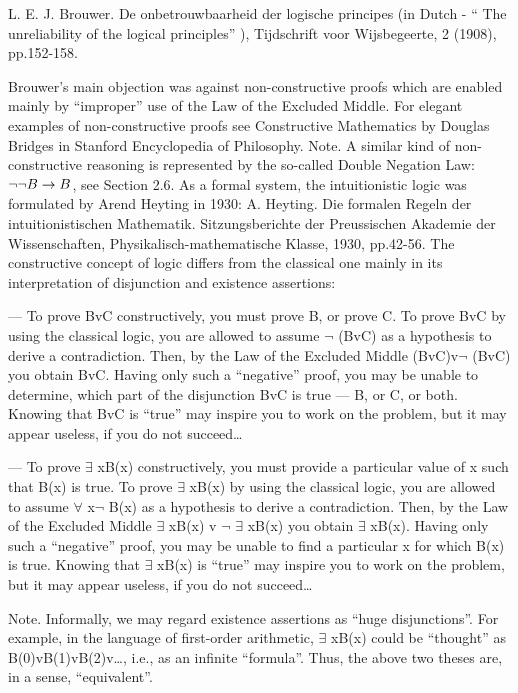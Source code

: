 L. E. J. Brouwer. De onbetrouwbaarheid der logische principes (in Dutch - `` The unreliability of the logical principles'' ), Tijdschrift voor Wijsbegeerte, 2 (1908), pp.152-158.

Brouwer's main objection was against non-constructive proofs which are enabled mainly by ``improper'' use of the Law of the Excluded Middle.  For elegant examples of non-constructive proofs see Constructive Mathematics by Douglas Bridges in Stanford Encyclopedia of Philosophy.  Note. A similar kind of non-constructive reasoning is represented by the so-called Double Negation Law: \(\neg \neg B\rightarrow B\), see Section 2.6.  As a formal system, the intuitionistic logic was formulated by Arend Heyting in 1930: A. Heyting. Die formalen Regeln der intuitionistischen Mathematik. Sitzungsberichte der Preussischen Akademie der Wissenschaften, Physikalisch-mathematische Klasse, 1930, pp.42-56.  The constructive concept of logic differs from the classical one mainly in its interpretation of disjunction and existence assertions:

--- To prove BvC constructively, you must prove B, or prove C. To prove BvC by using the classical logic, you are allowed to assume \(\neg\) (BvC) as a hypothesis to derive a contradiction. Then, by the Law of the Excluded Middle (BvC)v\(\neg\) (BvC) you obtain BvC. Having only such a ``negative'' proof, you may be unable to determine, which part of the disjunction BvC is true --- B, or C, or both. Knowing that BvC is ``true'' may inspire you to work on the problem, but it may appear useless, if you do not succeed\ldots

--- To prove \(\exists\) xB(x) constructively, you must provide a particular value of x such that B(x) is true. To prove \(\exists\) xB(x) by using the classical logic, you are allowed to assume \(\forall\) x\(\neg\) B(x) as a hypothesis to derive a contradiction. Then, by the Law of the Excluded Middle \(\exists\) xB(x) v \(\neg\) \(\exists\) xB(x) you obtain \(\exists\) xB(x). Having only such a ``negative'' proof, you may be unable to find a particular x for which B(x) is true. Knowing that \(\exists\) xB(x) is ``true'' may inspire you to work on the problem, but it may appear useless, if you do not succeed\ldots

\begin{note}
Note. Informally, we may regard existence assertions as ``huge disjunctions''. For example, in the language of first-order arithmetic, \(\exists\) xB(x) could be ``thought'' as B(0)vB(1)vB(2)v\ldots , i.e., as an infinite ``formula''. Thus, the above two theses are, in a sense, ``equivalent''.
\end{note}


